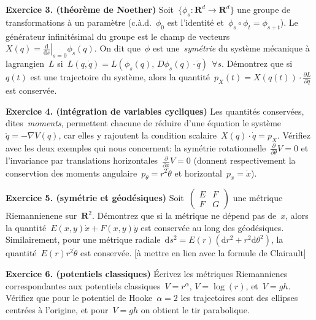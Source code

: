\documentclass[a4paper,11pt]{article}
\def\ud{\mathrm{d}}
\def\R{\mathbf{R}}
\begin{document}
{\bf Exercice 3. (théorème de Noether)}
Soit~$\{\phi_s:\R^d\to\R^d\}$ une groupe de transformations à un paramètre
(c.à.d.~$\phi_0$ est l'identité et~$\phi_s\circ\phi_t=\phi_{s+t}$).  Le
générateur infinitésimal du groupe est le champ de
vecteurs~$X(q)=\left.\frac{\ud}{\ud s}\right|_{s=0}\phi_s(q)$.  On dit
que~$\phi$ est une~\emph{symétrie} du système mécanique à lagrangien~$L$
si~$L(q,\dot q)=L(\phi_s(q),\,D\phi_s(q)\cdot\dot q)\ \ \forall s$.
Démontrez que si~$q(t)$ est une trajectoire du système, alors la
quantité~$p_X(t)=X(q(t))\cdot\frac{\partial L}{\partial\dot q}$ est conservée.

{\bf Exercice 4. (intégration de variables cycliques)}
Les quantités conservées, dites~\emph{moments}, permettent chacune de réduire
d'une équation le système~$\ddot q=-\nabla V(q)$, car elles y rajoutent la
condition scalaire~$X(q)\cdot\dot q=p_X$.
Vérifiez avec les deux exemples qui nous concernent: la symétrie
rotationnelle~$\frac{\partial}{\partial\theta}V=0$ et l'invariance par
translations horizontales~$\frac{\partial}{\partial x}V=0$ (donnent
respectivement la conservtion des moments angulaire~$p_\theta=r^2\dot\theta$ et
horizontal~$p_x=\dot x$).

{\bf Exercice 5. (symétrie et géodésiques)}
Soit~$\left(\begin{smallmatrix}E&F\\F&G\end{smallmatrix}\right)$ une métrique
Riemannienene sur~$\R^2$.  Démontrez que si la métrique ne dépend pas de~$x$,
alors la quantité~$E(x,y)\dot x+F(x,y)\dot y$ est conservée au long des
géodésiques.  Similairement, pour une métrique radiale~$\ud s^2=E(r)\left(\ud
r^2+r^2\ud\theta^2\right)$, la quantité~$E(r)r^2\dot\theta$ est conservée.
[à mettre en lien avec la formule de Clairault]

{\bf Exercice 6. (potentiels classiques)} Écrivez les métriques Riemannienes
correspondantes aux potentiels classiques~$V=r^\alpha$,
$V=\log(r)$, et~$V=gh$.  Vérifiez que pour le potentiel de Hooke~$\alpha=2$
les trajectoires sont des ellipses centrées à l'origine, et pour~$V=gh$ on
obtient le tir parabolique.

\end{document}
